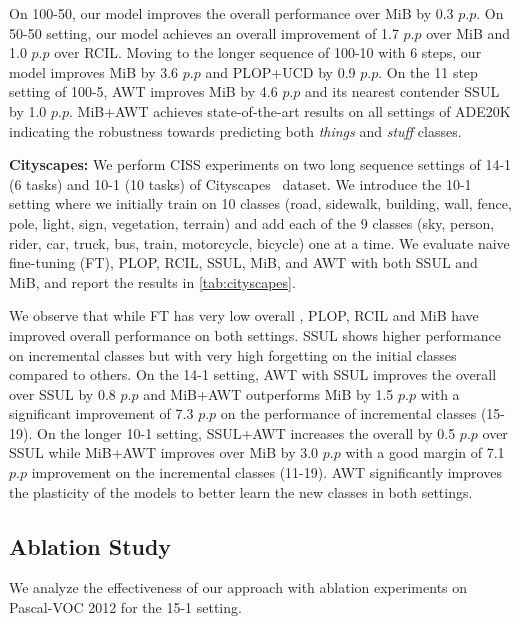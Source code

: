 On 100-50, our model improves the overall performance over MiB by 0.3 $p.p$.
On 50-50 setting, our model achieves an overall improvement of 1.7 $p.p$ over MiB and 1.0 $p.p$ over RCIL. Moving to the longer sequence of 100-10 with 6 steps, our model improves MiB by 3.6 $p.p$ and PLOP+UCD by 0.9 $p.p$. On the 11 step setting of 100-5, AWT improves MiB by 4.6 $p.p$ and its nearest contender SSUL by 1.0 $p.p$. MiB+AWT achieves state-of-the-art results on all settings of ADE20K indicating the robustness towards predicting both \emph{things} and \emph{stuff} classes.

\noindent\textbf{Cityscapes:} We perform CISS experiments on two long sequence settings of 14-1 (6 tasks) and 10-1 (10 tasks) of Cityscapes~\cite{cordts2016cityscapes} dataset. We introduce the 10-1 setting where we initially train on 10 classes (road, sidewalk, building, wall, fence, pole, light, sign, vegetation, terrain) and add each of the 9 classes (sky, person, rider, car, truck, bus, train, motorcycle, bicycle) one at a time. We evaluate naive fine-tuning (FT), PLOP, RCIL, SSUL, MiB, and AWT with both SSUL and MiB, and report the \miou{} results in \cref{tab:cityscapes}.

We observe that while FT has very low overall \miou{}, PLOP, RCIL and MiB have improved overall performance on both settings. SSUL shows higher performance on incremental classes but with very high forgetting on the initial classes compared to others.
On the 14-1 setting, AWT with SSUL improves the overall \miou{} over SSUL by 0.8 $p.p$ and MiB+AWT outperforms MiB by 1.5 $p.p$ with a significant improvement of 7.3 $p.p$ on the performance of incremental classes (15-19). On the longer 10-1 setting, SSUL+AWT increases the overall \miou{} by 0.5 $p.p$ over SSUL while MiB+AWT improves over MiB by 3.0 $p.p$ with a good margin of 7.1 $p.p$ improvement on the incremental classes (11-19). AWT significantly improves the plasticity of the models to better learn the new classes in both settings.



\subsection{Ablation Study}\label{sec:ablation}
We analyze the effectiveness of our approach with ablation experiments on Pascal-VOC 2012 for the 15-1 setting. 

